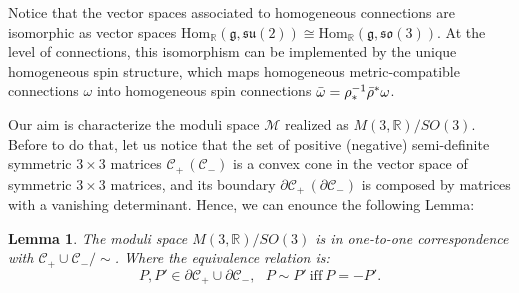 \documentclass{article}
\numberwithin{equation}{section}
\newtheorem{lemma}[proposition]{Lemma}
\theoremstyle{definition}
\newcommand{\R}{\mathbb{R}}
\newcommand{\g}{\mathfrak{g}}
\newcommand{\su}[1]{\mathfrak{su}(#1)}
\newcommand{\so}[1]{\mathfrak{so}(#1)}
\begin{document}
Notice that the vector spaces associated to homogeneous connections are isomorphic as vector spaces $\mathrm{Hom}_{\R}(\g,\su{2)}\cong\mathrm{Hom}_{\R}(\g,\so{3})$. At the level of connections, this isomorphism can be implemented by the unique homogeneous spin structure, which maps homogeneous metric-compatible connections $\omega$ into homogeneous spin connections $\Bar{\omega}=\rho_*^{-1}\Bar{\rho}^*\omega$.

\bigskip

Our aim is characterize the moduli space $\mathcal{M}$ realized as $M(3,\R)/SO(3)$. Before to do that, let us notice that the set of positive (negative) semi-definite symmetric $3\times 3$ matrices $\mathcal{C}_{+}\,(\mathcal{C}_-)$ is a convex cone in the vector space of symmetric $3\times 3$ matrices, and its boundary $\partial\mathcal{C}_+\,(\partial\mathcal{C}_-)$ is composed by matrices with a vanishing determinant. Hence, we can enounce the following Lemma:
    \begin{lemma}
        The moduli space $M(3,\R)/SO(3)$ is in one-to-one correspondence with $\mathcal{C}_{+}\cup\mathcal{C}_-/\sim$. Where the equivalence relation is:
        \begin{equation}
            P,P'\in \partial\mathcal{C}_+\cup\partial\mathcal{C}_-,\ \ \ P\sim P'\ \mathrm{iff} \ P=-P'.
        \end{equation}
    \end{lemma}
\end{document}
